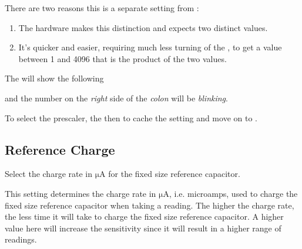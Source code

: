 \par\medskip

There are two reasons this is a separate setting from :

\begin{enumerate}
  \item The hardware makes this distinction and expects two distinct values.
  \item It's quicker and easier, requiring much less turning of the ,
    to get a value between \num{1} and \num{4096} that is the product of the
    two values.
\end{enumerate}

The  will show the following


and the number on the \textit{right} side of the \textit{colon} will be
\textit{blinking}.

\par\medskip

To select the prescaler,  the  then  to cache the setting
and move on to .


\subsection{Reference Charge} 

Select the charge rate in $\mathrm{\mu A}$ for the fixed size reference
capacitor.

\par\medskip

This setting determines the charge rate in $\mathrm{\mu A}$, i.e. microamps,
used to charge the fixed size reference capacitor when taking a reading.
The higher the charge rate, the less time it will take to charge the fixed size
reference capacitor.  A higher value here will increase the sensitivity since
it will result in a higher range of readings.

\par\medskip

